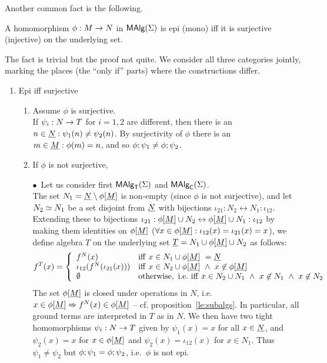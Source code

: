 \documentclass[10pt]{article}
\begin{document}
\noindent
Another common fact is the following.

\begin{Prop}
\label{fa:epimono}
A homomorphism $\phi : M \rightarrow N$ in $\mbox{\rm\sf MAlg}(\Sigma)$ is epi (mono) iff it
is surjective (injective) on the underlying set. 
\end{Prop}

\begin{Proof} 
The fact is trivial but the proof not quite. We consider all three
categories jointly, marking the places (the ``only if'' parts) where
the constructions differ.

\begin{enumerate}\MyLPar
\item 
Epi iff surjective

\begin{enumerate}\MyLPar

\item %

Assume $\phi$ is surjective. \\ 
If $\psi_i:N\rightarrow T$ for $i=1,2$ are different, then there is an
$n\in\underline {N}: \psi_1(n)\not=\psi_2(n)$.  By surjectivity of $\phi$
there is an $m\in\underline {M}:\phi(m)=n$, and so
$\phi;\psi_1\not=\phi;\psi_2$.

\item %

If $\phi$ is not surjective, 

$\bullet$\ Let us consider first $\mbox{\rm\sf MAlg}_{\sf T}(\Sigma)$ and $\mbox{\rm\sf MAlg}_{\sf C}(\Sigma)$.\\
The set $N_1=\underline {N}\setminus\phi[\underline {M}]$ is non-empty (since
$\phi$ is not surjective), and let $N_2\mathrel{\simeq} N_1$ be a set disjoint
from $\underline {N}$ with bijections $\iota_{21}:N_2\leftrightarrow
N_1:\iota_{12}$. Extending these to bijections $\iota_{21}:\phi[\underline {M}]\cup N_2\leftrightarrow \phi[\underline {M}]\cup N_1:\iota_{12}$ by making
them identities on $\phi[\underline {M}]$ ($\forall x\in\phi[\underline {M}]:\iota_{12}(x)=\iota_{21}(x)=x$), we define algebra $T$ on the
underlying set $\underline {T}=N_1\cup\phi[\underline {M}]\cup N_2$ as follows:
\[
f^T(x) = 
\left\{ \begin{array}{ll}
    f^N(x) & 
        {\rm iff\ } x\in N_1\cup\phi[\under M]\ =\under N \\
   \iota_{12}(f^N(\iota_{21}(x))) & 
        {\rm iff\ } x\in N_2\cup\phi[\under M]\
        \land\ x\not\in\phi[\under M] \\
   \es & 
        {\rm otherwise,\ i.e.\ iff\ } x\in N_2\cup N_1\ 
        \land\ x\not\in N_1\ \land\ x\not\in N_2 \\
\end{array}\right.
\]
%
The set $\phi[\underline {M}]$ is closed under operations in $N$, i.e.\ 
$x\in\phi[\underline {M}]\Rightarrow f^N(x)\in\phi[\underline {M}]$ -- cf.  proposition~\ref{le:subalgs}.  In particular, all ground
terms are interpreted in $T$ as in $N$.  We then have two tight
homomorphisms $\psi_i:N\rightarrow T$ given by $\psi_1(x)=x$ for all
$x\in\underline {N}$, and $\psi_2(x)=x$ for $x\in\phi[\underline {M}]$ and
$\psi_2(x)=\iota_{12}(x)$ for $x\in N_1$.  Thus $\psi_1\not=\psi_2$
but $\phi;\psi_1=\phi;\psi_2$, i.e.\ $\phi$ is not epi.


\end{enumerate}
\end{enumerate}
\end{Proof}
\end{document}
